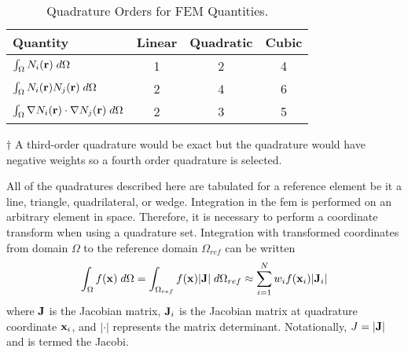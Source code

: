     \begin{table}
      \begin{center}
        \caption{Quadrature Orders for FEM Quantities.}
        \label{tab:quadrature_orders}
        \begin{threeparttable}
          \begin{tabular}{lccc}
            \toprule
            Quantity & Linear & Quadratic & Cubic \\
            \midrule
            $\int_{\Omega} N_i(\mathbf{r}) \;d\Omega$ & 1 & 2 & 4
              \tnote{$\dagger$} \\
            $\int_{\Omega} N_i(\mathbf{r}) N_j(\mathbf{r}) \;d\Omega$ &
              2 & 4 & 6 \\
            $\int_{\Omega} \mathbf{\nabla} N_i(\mathbf{r}) \cdot \mathbf{\nabla} N_j(\mathbf{r}) 
              \;d\Omega$ & 2 & 3 & 5 \\
            \bottomrule
          \end{tabular}
          \begin{tablenotes}
            \item[$\dagger$] A third-order quadrature would be exact but the 
              quadrature would have negative weights so a fourth order 
              quadrature is selected.
          \end{tablenotes}
        \end{threeparttable}
      \end{center}
    \end{table}
    
    All of the quadratures described here are tabulated for a reference element
    be it a line, triangle, quadrilateral, or wedge. Integration in the 
    \gls{fem} is performed on an arbitrary element in space. Therefore, it is 
    necessary to perform a coordinate transform when using a quadrature set.
    Integration with transformed coordinates from domain $\Omega$ to the
    reference domain $\Omega_{ref}$ can be written
    \begin{equation}
      \int_{\Omega} f(\mathbf{x}) \;d\Omega = 
        \int_{\Omega_{ref}} f(\mathbf{x}) \lvert \mathbf{J} \rvert \;d\Omega_{ref} \approx
        \sum_{i=1}^{N} w_i f(\mathbf{x}_i) \lvert \mathbf{J}_i \rvert
    \end{equation}
    where $\mathbf{J}$ is the Jacobian matrix, $\mathbf{J}_i$ is the Jacobian matrix at 
    quadrature coordinate $\mathbf{x}_i$, and $\lvert \cdot \rvert$ represents
    the matrix determinant. Notationally, $J=\lvert \mathbf{J} \rvert$ and is termed
    the Jacobi.

